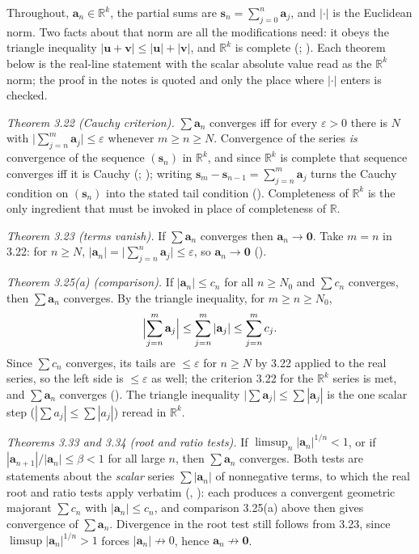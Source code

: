 \documentclass[main.tex]{subfiles}
\begin{document}
\begin{SolutionBlue}
Throughout, $\mathbf a_n\in\mathbb R^k$, the partial sums are $\mathbf s_n=\sum_{j=0}^{n}\mathbf a_j$,
and $|\cdot|$ is the Euclidean norm. Two facts about that norm are all the modifications need: it obeys
the triangle inequality $|\mathbf u+\mathbf v|\le|\mathbf u|+|\mathbf v|$, and $\mathbb R^k$ is complete
(; ). Each theorem below is the real-line
statement with the scalar absolute value read as the $\mathbb R^k$ norm; the proof in the notes is
quoted and only the place where $|\cdot|$ enters is checked.

\emph{Theorem 3.22 (Cauchy criterion).} $\sum\mathbf a_n$ converges iff for every $\varepsilon>0$ there
is $N$ with $\bigl|\sum_{j=n}^{m}\mathbf a_j\bigr|\le\varepsilon$ whenever $m\ge n\ge N$. Convergence of
the series \emph{is} convergence of the sequence $(\mathbf s_n)$ in $\mathbb R^k$, and since $\mathbb
R^k$ is complete that sequence converges iff it is Cauchy (; ); writing $\mathbf s_m-\mathbf s_{n-1}=\sum_{j=n}^{m}\mathbf a_j$ turns the Cauchy condition
on $(\mathbf s_n)$ into the stated tail condition (). Completeness of $\mathbb R^k$ is the
only ingredient that must be invoked in place of completeness of $\mathbb R$.

\emph{Theorem 3.23 (terms vanish).} If $\sum\mathbf a_n$ converges then $\mathbf a_n\to\mathbf 0$. Take
$m=n$ in 3.22: for $n\ge N$, $|\mathbf a_n|=\bigl|\sum_{j=n}^{n}\mathbf a_j\bigr|\le\varepsilon$, so
$\mathbf a_n\to\mathbf 0$ ().

\emph{Theorem 3.25(a) (comparison).} If $|\mathbf a_n|\le c_n$ for all $n\ge N_0$ and $\sum c_n$
converges, then $\sum\mathbf a_n$ converges. By the triangle inequality, for $m\ge n\ge N_0$,
\[
\Bigl|\sum_{j=n}^{m}\mathbf a_j\Bigr|\le\sum_{j=n}^{m}|\mathbf a_j|\le\sum_{j=n}^{m}c_j .
\]
Since $\sum c_n$ converges, its tails are $\le\varepsilon$ for $n\ge N$ by 3.22 applied to the real
series, so the left side is $\le\varepsilon$ as well; the criterion 3.22 for the $\mathbb R^k$ series is
met, and $\sum\mathbf a_n$ converges (). The triangle inequality $\bigl|\sum\mathbf
a_j\bigr|\le\sum|\mathbf a_j|$ is the one scalar step ($|\sum a_j|\le\sum|a_j|$) reread in $\mathbb R^k$.

\emph{Theorems 3.33 and 3.34 (root and ratio tests).} If $\limsup_n|\mathbf a_n|^{1/n}<1$, or if
$|\mathbf a_{n+1}|/|\mathbf a_n|\le\beta<1$ for all large $n$, then $\sum\mathbf a_n$ converges. Both
tests are statements about the \emph{scalar} series $\sum|\mathbf a_n|$ of nonnegative terms, to which
the real root and ratio tests apply verbatim (, ): each produces a convergent
geometric majorant $\sum c_n$ with $|\mathbf a_n|\le c_n$, and comparison 3.25(a) above then gives
convergence of $\sum\mathbf a_n$. Divergence in the root test still follows from 3.23, since
$\limsup|\mathbf a_n|^{1/n}>1$ forces $|\mathbf a_n|\not\to 0$, hence $\mathbf a_n\not\to\mathbf 0$.


\end{SolutionBlue}
\end{document}
